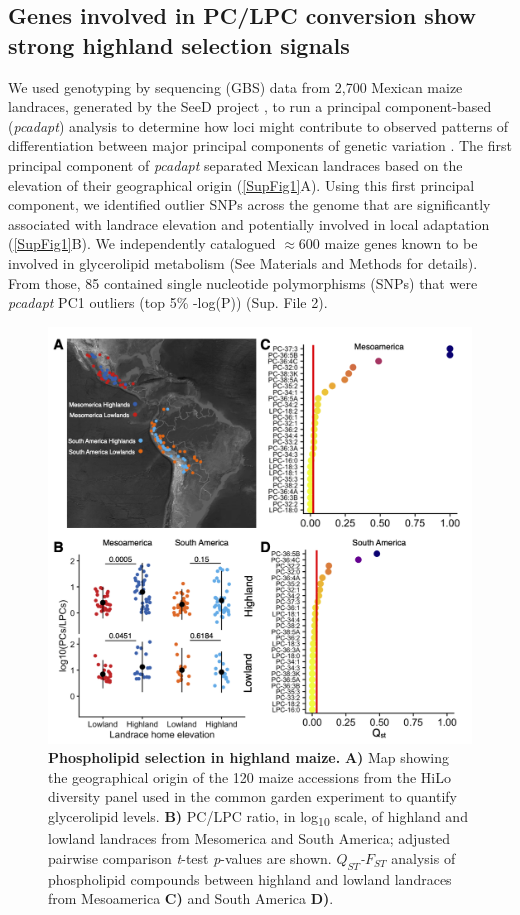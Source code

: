 \documentclass[9pt,twocolumn,twoside,lineno]{biorxiv}
\begin{document}
\subsection{Genes involved in PC/LPC conversion show strong highland selection signals} 
We used genotyping by sequencing (GBS) data from 2,700 Mexican maize landraces, generated by the SeeD project \cite{Romero_Navarro2017-cn, Gates2019-xu}, to run a principal component-based (\textit{pcadapt}) analysis to determine how loci might contribute to observed patterns of differentiation between major principal components of genetic variation \cite{Luu2017-ws}.
The first principal component of \textit{pcadapt} separated Mexican landraces based on the elevation of their geographical origin (\ref{SupFig1}A).
Using this first principal component, we identified outlier SNPs across the genome that are significantly associated with landrace elevation and potentially involved in local adaptation (\ref{SupFig1}B).
We independently catalogued $\approx 600$ maize genes known to be involved in glycerolipid metabolism (See Materials and Methods for details). From those, 85 contained single nucleotide polymorphisms (SNPs) that were \textit{pcadapt} PC1 outliers (top 5\% -log(P)) (Sup. File 2).
\begin{figure}[hbp]
\begin{center}
\includegraphics[width=0.4\paperwidth]{Figures/Fig_1.png}
\caption{\textbf{Phospholipid selection in highland maize.} 
\textbf{A)} Map showing the geographical origin of the 120 maize accessions from the HiLo diversity panel used in the common garden experiment to quantify glycerolipid levels.
\textbf{B)} PC/LPC ratio, in log\textsubscript{10} scale, of highland and lowland landraces from Mesomerica and South America; adjusted pairwise comparison \textit{t}-test \textit{p}-values are shown.
\textit{$Q_{ST}$-$F_{ST}$} analysis of phospholipid compounds between highland and lowland landraces from Mesoamerica \textbf{C)} and South America \textbf{D)}.
} 
\label{Fig1}
\end{center}
\end{figure}
\end{document}

